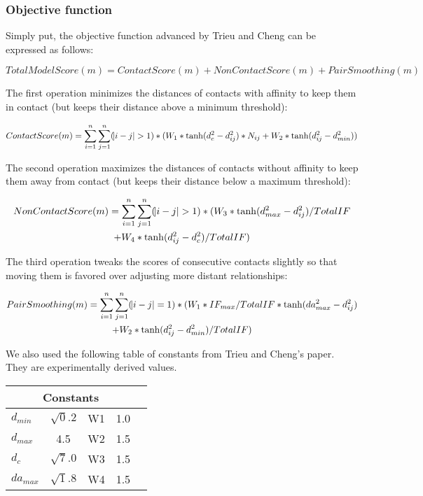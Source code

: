 \documentclass{article}
\begin{document}
\subsubsection{Objective function}

Simply put, the objective function advanced by Trieu and Cheng can be expressed as follows:

\begin{equation}
      TotalModelScore(m) = ContactScore(m) + NonContactScore(m) + PairSmoothing(m)
\end{equation}

The first operation minimizes the distances of contacts with affinity to keep them in contact (but keeps their distance above a minimum threshold):

\begin{equation}
      ContactScore(m) = \sum_{i=1}^{n} \sum_{j=1}^{n} (\abs{i-j}>1) * (W_1 * \tanh(d_c^2-d_{ij}^2) * N_{ij} + W_2 * \tanh(d_{ij}^2-d_{min}^2))
\end{equation}

The second operation maximizes the distances of contacts without affinity to keep them away from contact (but keeps their distance below a maximum threshold):

\begin{multline}
      NonContactScore(m) = \sum_{i=1}^{n} \sum_{j=1}^{n} (\abs{i-j}>1) * (W_3 * \tanh(d_{max}^2-d_{ij}^2) / TotalIF \\+ W_4 * \tanh(d_{ij}^2-d_{c}^2) / TotalIF)
\end{multline}

The third operation tweaks the scores of consecutive contacts slightly so that moving them is favored over adjusting more distant relationships:

\begin{multline}
      PairSmoothing(m) = \sum_{i=1}^{n} \sum_{j=1}^{n} (\abs{i-j}=1) * (W_1 * IF_{max} / TotalIF * \tanh(da_{max}^2-d_{ij}^2) \\+ W_2 * \tanh(d_{ij}^2-d_{min}^2) / TotalIF)
\end{multline}

We also used the following table of constants from Trieu and Cheng's paper.  They are experimentally derived values.

\begin{center}
\begin{tabular}{|l|c|c|c|r|}
\multicolumn{4}{c}{Constants} \\
    \hline
    $d_{min}$ & $\sqrt 0.2$ & W1 & 1.0           \\ \hline
    $d_{max}$ & 4.5  & W2 & 1.5      \\ \hline
    $d_{c}$ & $\sqrt 7.0$  & W3 & 1.5            \\ \hline
    $da_{max}$ & $\sqrt 1.8$  & W4 & 1.5     \\ \hline
    \end{tabular}
\end{center}
\end{document}

